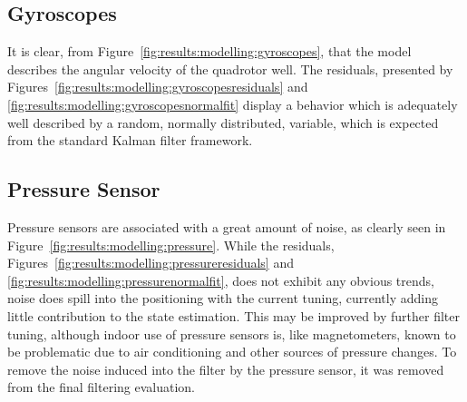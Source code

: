     \subsection{Gyroscopes}
        \label{ssec:results:modelling:gyroscopes}
        It is clear, from Figure~\ref{fig:results:modelling:gyroscopes}, that
        the model describes the angular velocity of the quadrotor well.
        The residuals, presented by Figures~\ref{fig:results:modelling:gyroscopesresiduals}
        and \ref{fig:results:modelling:gyroscopesnormalfit}
        display a behavior which is adequately well described by a random,
        normally distributed, variable, which is expected from the
        standard Kalman filter framework.

    \subsection{Pressure Sensor}
        Pressure sensors are associated with a great amount of noise,
        as clearly seen in Figure~\ref{fig:results:modelling:pressure}.
        While the residuals, Figures~\ref{fig:results:modelling:pressureresiduals}
        and \ref{fig:results:modelling:pressurenormalfit}, does not exhibit
        any obvious trends, noise does spill into the positioning with
        the current tuning, currently adding little contribution
        to the state estimation. This may be improved by further filter tuning,
        although indoor use of pressure sensors is, like magnetometers, known to
        be problematic due to air conditioning and other sources of pressure changes.
        To remove the noise induced into the filter by the pressure sensor,
        it was removed from the final filtering evaluation.

